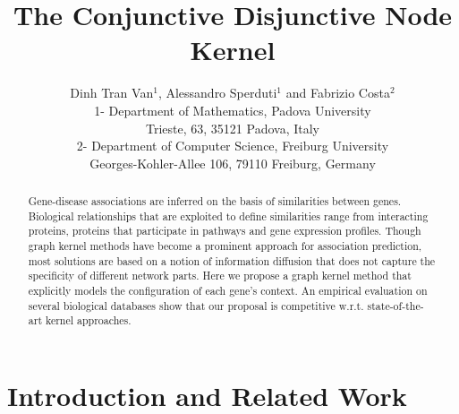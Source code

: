 \documentclass{esannV2}
\begin{document}
\title{The Conjunctive Disjunctive Node Kernel}

\author{Dinh Tran Van$^1$, Alessandro Sperduti$^1$ and Fabrizio Costa$^2$
%
%
\vspace{.3cm}\\
%
1- Department of Mathematics, Padova University\\
Trieste, 63, 35121 Padova, Italy
%
\vspace{.1cm}\\
2- Department of Computer Science, Freiburg University \\
Georges-Kohler-Allee 106, 79110 Freiburg, Germany\\
}

\maketitle

\begin{abstract} Gene-disease associations are inferred on the basis of
similarities between genes. Biological relationships that are exploited to
define similarities range from interacting proteins, proteins that participate
in pathways and gene expression profiles. Though graph kernel methods have
become a prominent approach for association prediction, most solutions are
based on a notion of information diffusion that does not capture the
specificity of different network parts. Here we propose a graph kernel method that
explicitly models the configuration of each gene's context. An empirical
evaluation on several biological databases show that our proposal is
competitive w.r.t. state-of-the-art kernel approaches.

\end{abstract}

\section{Introduction and Related Work} \label{introduction} 
\end{document}
